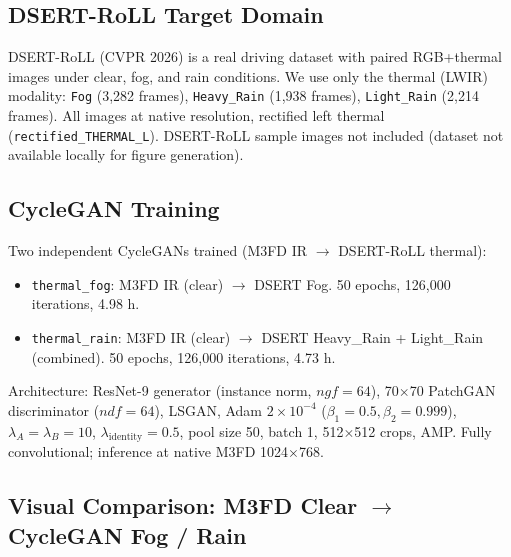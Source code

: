 \documentclass[11pt,a4paper]{article}
\begin{document}
\subsection{DSERT-RoLL Target Domain}

DSERT-RoLL (CVPR 2026) is a real driving dataset with paired RGB+thermal images under clear, fog, and rain conditions. We use only the thermal (LWIR) modality: \texttt{Fog} (3,282 frames), \texttt{Heavy\_Rain} (1,938 frames), \texttt{Light\_Rain} (2,214 frames). All images at native resolution, rectified left thermal (\texttt{rectified\_THERMAL\_L}). DSERT-RoLL sample images not included (dataset not available locally for figure generation).

\subsection{CycleGAN Training}

Two independent CycleGANs trained (M3FD IR $\to$ DSERT-RoLL thermal):

\begin{itemize}
\item \texttt{thermal\_fog}: M3FD IR (clear) $\to$ DSERT Fog. 50 epochs, 126,000 iterations, 4.98 h.
\item \texttt{thermal\_rain}: M3FD IR (clear) $\to$ DSERT Heavy\_Rain + Light\_Rain (combined). 50 epochs, 126,000 iterations, 4.73 h.
\end{itemize}

Architecture: ResNet-9 generator (instance norm, $ngf=64$), 70$\times$70 PatchGAN discriminator ($ndf=64$), LSGAN, Adam $2\times10^{-4}$ ($\beta_1=0.5, \beta_2=0.999$), $\lambda_A=\lambda_B=10$, $\lambda_{\text{identity}}=0.5$, pool size 50, batch 1, 512$\times$512 crops, AMP. Fully convolutional; inference at native M3FD 1024$\times$768.

\subsection{Visual Comparison: M3FD Clear $\to$ CycleGAN Fog / Rain}
\end{document}
